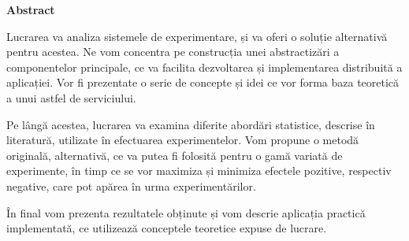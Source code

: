 \thispagestyle{plain}

\vspace*{\fill}

\begin{center}
	\Large \textbf{Abstract}	
\end{center}

Lucrarea va analiza sistemele de experimentare, și va oferi o soluție alternativă pentru acestea. Ne vom concentra pe construcția unei abstractizări a componentelor principale, ce va facilita dezvoltarea și implementarea distribuită a aplicației. Vor fi prezentate o serie de concepte și idei ce vor forma baza teoretică a unui astfel de serviciului.

Pe lângă acestea, lucrarea va examina diferite abordări statistice, descrise în literatură, utilizate în efectuarea experimentelor. Vom propune o metodă originală, alternativă, ce va putea fi folosită pentru o gamă variată de experimente, în timp ce se vor maximiza și minimiza efectele pozitive, respectiv negative, care pot apărea în urma experimentărilor.

În final vom prezenta rezultatele obținute și vom descrie aplicația practică implementată, ce utilizează conceptele teoretice expuse de lucrare.

\vspace*{\fill}
